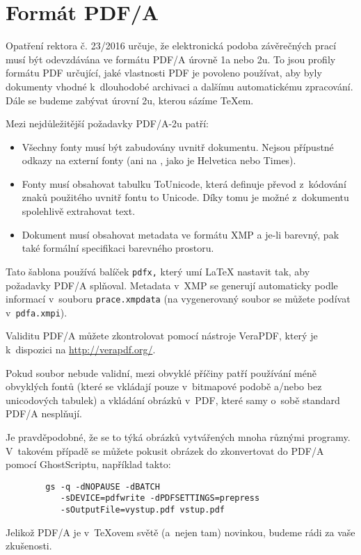 
\chapter{Formát PDF/A}

Opatření rektora č. 23/2016 určuje, že elektronická podoba závěrečných
prací musí být odevzdávána ve formátu PDF/A úrovně 1a nebo 2u. To jsou
profily formátu PDF určující, jaké vlastnosti PDF je povoleno používat,
aby byly dokumenty vhodné k~dlouhodobé archivaci a dalšímu automatickému
zpracování. Dále se budeme zabývat úrovní 2u, kterou sázíme \TeX{}em.

Mezi nejdůležitější požadavky PDF/A-2u patří:

\begin{itemize}

\item Všechny fonty musí být zabudovány uvnitř dokumentu. Nejsou přípustné
odkazy na externí fonty (ani na , jako je Helvetica nebo Times).

\item Fonty musí obsahovat tabulku ToUnicode, která definuje převod z~kódování
znaků použitého uvnitř fontu to Unicode. Díky tomu je možné z~dokumentu
spolehlivě extrahovat text.

\item Dokument musí obsahovat metadata ve formátu XMP a je-li barevný,
pak také formální specifikaci barevného prostoru.

\end{itemize}

Tato šablona používá balíček {\tt pdfx,} který umí \LaTeX{} nastavit tak,
aby požadavky PDF/A splňoval. Metadata v~XMP se generují automaticky podle
informací v~souboru {\tt prace.xmpdata} (na vygenerovaný soubor se můžete
podívat v~{\tt pdfa.xmpi}).

Validitu PDF/A můžete zkontrolovat pomocí nástroje VeraPDF, který je
k~dispozici na \url{http://verapdf.org/}.

Pokud soubor nebude validní, mezi obvyklé příčiny patří používání méně
obvyklých fontů (které se vkládají pouze v~bitmapové podobě a/nebo bez
unicodových tabulek) a vkládání obrázků v~PDF, které samy o~sobě standard
PDF/A nesplňují.

Je pravděpodobné, že se to týká obrázků vytvářených mnoha různými programy.
V~takovém případě se můžete pokusit obrázek do zkonvertovat do PDF/A pomocí
GhostScriptu, například takto:

\begin{verbatim}
        gs -q -dNOPAUSE -dBATCH
           -sDEVICE=pdfwrite -dPDFSETTINGS=prepress
           -sOutputFile=vystup.pdf vstup.pdf
\end{verbatim}

Jelikož PDF/A je v~\TeX{}ovem světě (a~nejen tam) novinkou, budeme rádi
za vaše zkušenosti.
